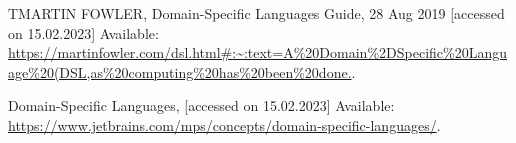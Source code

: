 \begin{thebibliography}{99}
\singlespace \normalsize

  TMARTIN FOWLER, Domain-Specific Languages Guide, 28 Aug 2019 [accessed on 15.02.2023] Available:
  \url{https://martinfowler.com/dsl.html#:~:text=A%20Domain%2DSpecific%20Language%20(DSL,as%20computing%20has%20been%20done.}.

  Domain-Specific Languages, [accessed on 15.02.2023] Available:
  \url{https://www.jetbrains.com/mps/concepts/domain-specific-languages/}.
  
\end{thebibliography}

